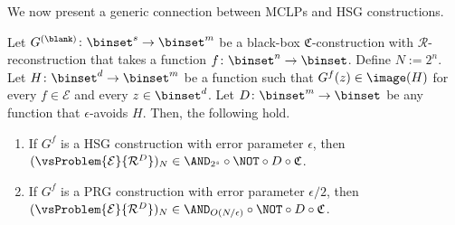 \documentclass{toc}
\begin{document}
%
We now present a generic connection between
MCLPs
and HSG constructions.
\begin{theorem}
  \label{thm_Generic}
  Let $G^{(\blank)} \colon \binset^s \to \binset^m$
  be a black-box $\mathfrak{C}$-construction with $\mathcal{R}$-reconstruction
  that takes a function $f \colon \binset^n \to \binset$.
  Define $N := 2^n$.
  Let $H \colon \binset^{d} \to \binset^m$ be a function such that $G^f(z) \in \image(H)$
  for every $f \in \mathcal{E}$ and every $z \in \binset^{d}$.
  Let $D \colon \binset^m \to \binset$ be any function that $\epsilon$-avoids $H$.
  Then, the following hold.
  \begin{enumerate}
    \item
          If
          $G^f$ is a HSG construction with error parameter $\epsilon$,
          then
          $(\vsProblem{\mathcal{E}}{\mathcal{R}^D})_N \in \AND_{2^s} \circ \NOT \circ D \circ \mathfrak{C}$.
    \item
          If
          $G^f$ is a PRG construction with error parameter $\epsilon / 2$,
          then
          $(\vsProblem{\mathcal{E}}{\mathcal{R}^D})_N \in \AND_{O(N/\epsilon)} \circ \NOT \circ D \circ \mathfrak{C}$.
  \end{enumerate}
\end{theorem}
\end{document}
